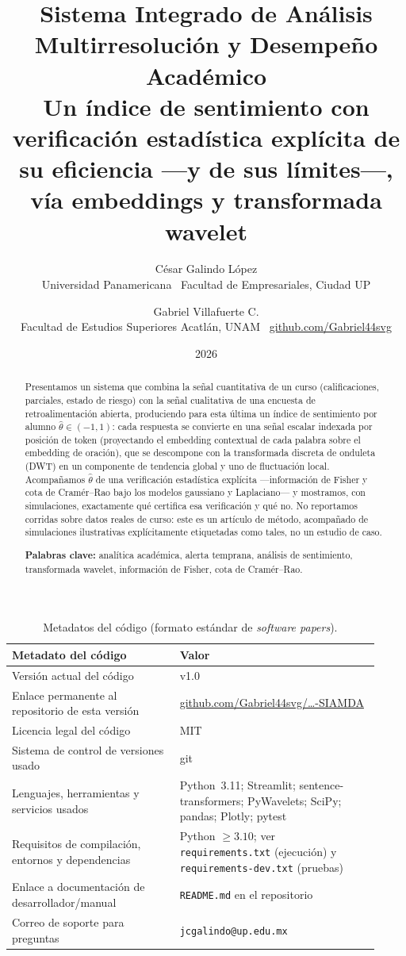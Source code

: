 \documentclass[11pt,a4paper,oneside]{article}
\title{\vspace{-1.5cm}\textbf{\Large Sistema Integrado de Análisis Multirresolución y Desempeño Académico}\\[2pt]
\large Un índice de sentimiento con verificación estadística explícita de su eficiencia —y de sus límites—, vía embeddings y transformada wavelet}
\author{César Galindo López \\ \small Universidad Panamericana \textperiodcentered\ Facultad de Empresariales, Ciudad UP
  \and Gabriel Villafuerte C. \\ \small Facultad de Estudios Superiores Acatlán, UNAM \textperiodcentered\
  \href{https://github.com/Gabriel44svg}{github.com/Gabriel44svg}}
\date{\small 2026}
\theoremstyle{definition}
\begin{document}
\maketitle

\begin{abstract}
\noindent Presentamos un sistema que combina la señal cuantitativa de un curso (calificaciones,
parciales, estado de riesgo) con la señal cualitativa de una encuesta de retroalimentación
abierta, produciendo para esta última un índice de sentimiento por alumno
$\hat\theta\in(-1,1)$: cada respuesta se convierte en una señal escalar indexada por posición de
token (proyectando el embedding contextual de cada palabra sobre el embedding de oración), que
se descompone con la transformada discreta de onduleta (DWT) en un componente de tendencia
global y uno de fluctuación local. Acompañamos $\hat\theta$ de una verificación estadística
explícita —información de Fisher y cota de Cramér--Rao bajo los modelos gaussiano y
Laplaciano— y mostramos, con simulaciones, exactamente qué certifica esa verificación y qué no.
No reportamos corridas sobre datos reales de curso: este es un artículo de método,
acompañado de simulaciones ilustrativas explícitamente etiquetadas como tales, no un estudio de
caso.

\medskip
\noindent\textbf{Palabras clave:} analítica académica, alerta temprana, análisis de sentimiento,
transformada wavelet, información de Fisher, cota de Cramér--Rao.
\end{abstract}

\begin{table}[h]
\centering
\small
\begin{tabular}{@{}p{0.42\linewidth}p{0.5\linewidth}@{}}
\toprule
\textbf{Metadato del código} & \textbf{Valor} \\
\midrule
Versión actual del código & v1.0 \\
Enlace permanente al repositorio de esta versión &
  \href{https://github.com/Gabriel44svg/Galindo-C.-J.-y-Villafuerte-C.-G.-2026-.-SIAMDA}{github.com/Gabriel44svg/\ldots-SIAMDA} \\
Licencia legal del código & MIT \\
Sistema de control de versiones usado & git \\
Lenguajes, herramientas y servicios usados &
  Python~3.11; Streamlit; sentence-transformers; PyWavelets; SciPy; pandas; Plotly; pytest \\
Requisitos de compilación, entornos y dependencias &
  Python $\ge 3.10$; ver \texttt{requirements.txt} (ejecución) y \texttt{requirements-dev.txt}
  (pruebas) \\
Enlace a documentación de desarrollador/manual &
  \texttt{README.md} en el repositorio \\
Correo de soporte para preguntas & \texttt{jcgalindo@up.edu.mx} \\
\bottomrule
\end{tabular}
\caption{Metadatos del código (formato estándar de \emph{software papers}).}
\label{tab:metadata}
\end{table}
\end{document}
